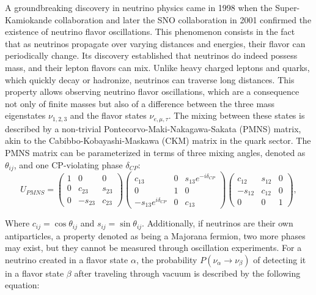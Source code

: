 A groundbreaking discovery in neutrino physics came in 1998 when the Super-Kamiokande collaboration  \cite{fukuda1998evidence} and later the SNO
collaboration in 2001  \cite{ahmad2001measurement} confirmed the existence of neutrino flavor oscillations. This phenomenon consists in the fact that
as neutrinos propagate over varying distances and energies, their flavor can periodically change. Its discovery established that neutrinos do indeed possess mass, and their lepton flavors can mix.
Unlike heavy charged leptons and quarks, which quickly decay or hadronize, neutrinos 
can traverse long distances. This property allows observing neutrino flavor oscillations, which are a
consequence not only of finite masses but also of a difference between the three mass eigenstates $\nu_{1,2,3}$ and the
flavor states $\nu_{e,\mu,\tau}$. 
The mixing between these states is described by a non-trivial Pontecorvo-Maki-Nakagawa-Sakata (PMNS) matrix, akin to the
Cabibbo-Kobayashi-Maskawa (CKM) matrix in the quark sector. The PMNS matrix can be parameterized in terms of three
mixing angles, denoted as $\theta_{ij}$, and one CP-violating phase $\delta_{CP}$:
\begin{equation}
U_{PMNS} = \begin{pmatrix}
1 & 0 & 0 \\
0 & c_{23} & s_{23} \\
0 & -s_{23} & c_{23}
\end{pmatrix}
\begin{pmatrix}
c_{13} & 0 & s_{13}e^{-i\delta_{CP}} \\
0 & 1 & 0 \\
-s_{13}e^{i\delta_{CP}} & 0 & c_{13}
\end{pmatrix}
\begin{pmatrix}
c_{12} & s_{12} & 0 \\
-s_{12} & c_{12} & 0 \\
0 & 0 & 1
\end{pmatrix},
\end{equation}

Where $c_{ij} = \cos\theta_{ij}$ and $s_{ij} = \sin\theta_{ij}$. Additionally, if neutrinos are their own antiparticles,
a property denoted as being a Majorana fermion, two more phases may exist, but they cannot be measured through
oscillation experiments. For a neutrino created in a flavor state $\alpha$, the probability $P(\nu_\alpha \rightarrow
\nu_\beta)$ of detecting it in a flavor state $\beta$ after traveling through vacuum is described by the following equation:

